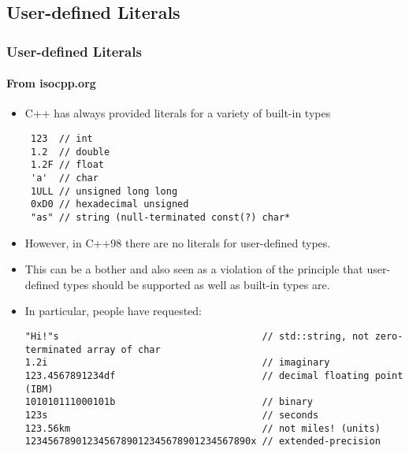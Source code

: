 \subsection{User-defined Literals}
\begin{frame}[fragile,t]
\frametitle{User-defined Literals}
\framesubtitle{From isocpp.org}
\begin{itemize}[<+->]
\item C++ has always provided literals for a variety of built-in types
{\scriptsize\begin{verbatim}
 123  // int
 1.2  // double
 1.2F // float
 'a'  // char
 1ULL // unsigned long long
 0xD0 // hexadecimal unsigned
 "as" // string (null-terminated const(?) char*
\end{verbatim}
}
\item However, in C++98 there are no literals for user-defined types.
\item This can be a bother and also seen as a violation of the
  principle that user-defined types should be supported as well as
  built-in types are.
\item In particular, people have requested:
{\scriptsize\begin{verbatim}
"Hi!"s                                    // std::string, not zero-terminated array of char
1.2i                                      // imaginary
123.4567891234df                          // decimal floating point (IBM)
101010111000101b                          // binary
123s                                      // seconds
123.56km                                  // not miles! (units)
1234567890123456789012345678901234567890x // extended-precision
\end{verbatim}
}

\end{itemize}
\end{frame}

